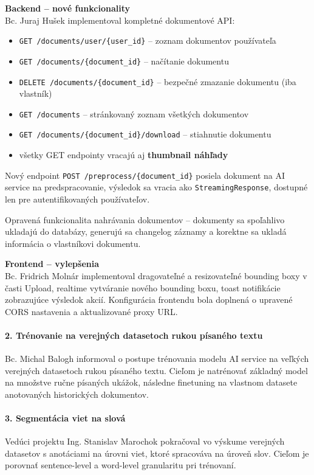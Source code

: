 \textbf{Backend – nové funkcionality} \\
Bc. Juraj Hušek implementoval kompletné dokumentové API:
\begin{itemize}
    \item \texttt{GET /documents/user/\{user\_id\}} – zoznam dokumentov používateľa
    \item \texttt{GET /documents/\{document\_id\}} – načítanie dokumentu
    \item \texttt{DELETE /documents/\{document\_id\}} – bezpečné zmazanie dokumentu (iba vlastník)
    \item \texttt{GET /documents} – stránkovaný zoznam všetkých dokumentov
    \item \texttt{GET /documents/\{document\_id\}/download} – stiahnutie dokumentu
    \item všetky GET endpointy vracajú aj \textbf{thumbnail náhľady}
\end{itemize}
Nový endpoint \texttt{POST /preprocess/\{document\_id\}} posiela dokument na AI service na predspracovanie, výsledok sa vracia ako \texttt{StreamingResponse}, dostupné len pre autentifikovaných používateľov.

Opravená funkcionalita nahrávania dokumentov – dokumenty sa spoľahlivo ukladajú do databázy, generujú sa changelog záznamy a korektne sa ukladá informácia o vlastníkovi dokumentu.

\textbf{Frontend – vylepšenia} \\
Bc. Fridrich Molnár implementoval dragovateľné a resizovateľné bounding boxy v časti Upload, realtime vytváranie nového bounding boxu, toast notifikácie zobrazujúce výsledok akcií. Konfigurácia frontendu bola doplnená o upravené CORS nastavenia a aktualizované proxy URL.

\paragraph{2. Trénovanie na verejných datasetoch rukou písaného textu}
Bc. Michal Balogh informoval o postupe trénovania modelu AI service na veľkých verejných datasetoch rukou písaného textu. Cieľom je natrénovať základný model na množstve ručne písaných ukážok, následne finetuning na vlastnom datasete anotovaných historických dokumentov.

\paragraph{3. Segmentácia viet na slová}
Vedúci projektu Ing. Stanislav Marochok pokračoval vo výskume verejných datasetov s anotáciami na úrovni viet, ktoré spracováva na úroveň slov. Cieľom je porovnať sentence-level a word-level granularitu pri trénovaní.

